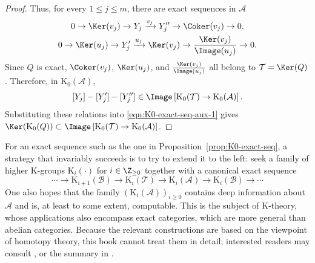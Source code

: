 \begin{proof}
Thus, for every $1\leq j\leq m$, there are exact sequences in $\mathcal{A}$
\begin{gather*}
	0\to\Ker(v_j)\to Y_j\xrightarrow{v_j}Y''_j
	\to\Coker(v_j)\to0,\\
	0\to\Ker(u_j)\to Y'_j\xrightarrow{u_j}\Ker(v_j)
	\to\frac{\Ker(v_j)}{\Image(u_j)}\to0.
\end{gather*}
Since $Q$ is exact, $\Coker(v_j)$, $\Ker(u_j)$, and
$\frac{\Ker(v_j)}{\Image(u_j)}$ all belong to
$\mathcal{T}=\Ker(Q)$. Therefore, in $\mathrm{K}_0(\mathcal{A})$,
\[[Y_j]-[Y'_j]-[Y''_j]\in
\Image\left[\mathrm{K}_0(\mathcal{T})
\to\mathrm{K}_0(\mathcal{A})\right].\]
Substituting these relations into \eqref{eqn:K0-exact-seq-aux-1} gives
$\Ker(\mathrm{K}_0(Q))\subset
\Image\left[\mathrm{K}_0(\mathcal{T})
\to\mathrm{K}_0(\mathcal{A})\right]$.
\end{proof}

For an exact sequence such as the one in
Proposition~\ref{prop:K0-exact-seq}, a strategy that invariably succeeds is to
try to extend it to the left: seek a family of higher K-groups
$\mathrm{K}_i(\cdot)$ for $i\in\Z_{\geq0}$ together with a canonical exact
sequence
\[\cdots\to\mathrm{K}_{i+1}(\mathcal{B})
\to\mathrm{K}_i(\mathcal{T})\to\mathrm{K}_i(\mathcal{A})
\to\mathrm{K}_i(\mathcal{B})\to\cdots\]
One also hopes that the family
$(\mathrm{K}_i(\mathcal{A}))_{i\geq0}$ contains deep information about
$\mathcal{A}$ and is, at least to some extent, computable. This is the subject
of K-theory, whose applications also encompass exact categories, which are
more general than abelian categories. Because the relevant constructions are
based on the viewpoint of homotopy theory, this book cannot treat them in
detail; interested readers may consult \cite{Lai19}, or the summary in
\cite[\S 13.6]{Bu10}.

